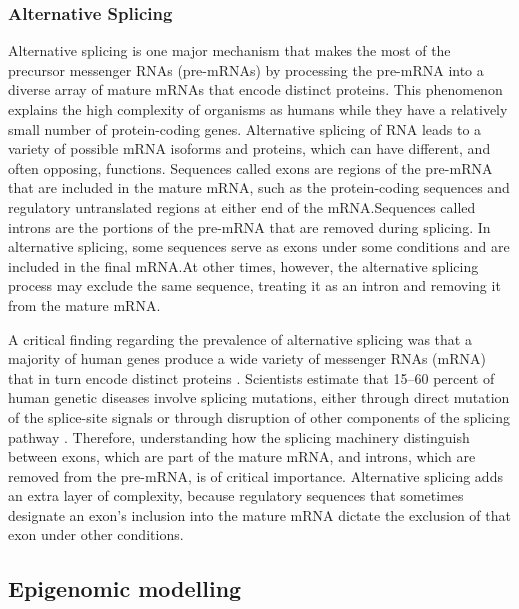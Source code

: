 \subsubsection{Alternative Splicing}

Alternative splicing is one major mechanism that makes the most of the precursor messenger RNAs (pre-mRNAs) by processing the pre-mRNA into a diverse array of mature mRNAs that encode distinct proteins. This phenomenon explains the high complexity of organisms as humans while they have a relatively small number of protein-coding genes. Alternative splicing of RNA leads to a variety of possible mRNA isoforms and proteins, which can have different, and often opposing, functions. Sequences called exons are regions of the pre-mRNA that are included in the mature mRNA, such as the protein-coding sequences and regulatory untranslated regions at either end of the mRNA.\@ Sequences called introns are the portions of the pre-mRNA that are removed during splicing. In alternative splicing, some sequences serve as exons under some conditions and are included in the final mRNA.\@ At other times, however, the alternative splicing process may exclude the same sequence, treating it as an intron and removing it from the mature mRNA.\@

\medskip

A critical finding regarding the prevalence of alternative splicing was that a majority of human genes produce a wide variety of messenger RNAs (mRNA) that in turn encode distinct proteins \cite{Johnson2003}. Scientists estimate that 15–60 percent of human genetic diseases involve splicing mutations, either through direct mutation of the splice-site signals or through disruption of other components of the splicing pathway \cite{Wang2007}. Therefore, understanding how the splicing machinery distinguish between exons, which are part of the mature mRNA, and introns, which are removed from the pre-mRNA, is of critical importance. Alternative splicing adds an extra layer of complexity, because regulatory sequences that sometimes designate an exon's inclusion into the mature mRNA dictate the exclusion of that exon under other conditions.


\subsection{Epigenomic modelling}

